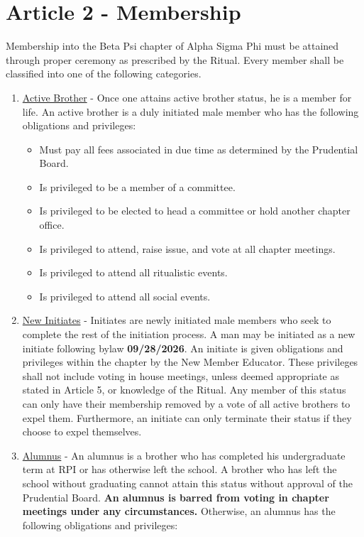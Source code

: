 \documentclass{article}
\begin{document}
\section*{Article 2 - Membership}
\hspace*{1cm}Membership into the Beta Psi chapter of Alpha Sigma Phi must be attained through proper ceremony as prescribed by the Ritual. Every member shall be classified into one of the following categories.
\begin{enumerate}
    \item  \underline{Active Brother} - Once one attains active brother status, he is a member for life. An active  brother is a duly initiated male member who has the following obligations and privileges:
    \begin{itemize}
        \item Must pay all fees associated in due time as determined by the Prudential Board.
        \item Is privileged to be a member of a committee.
        \item Is privileged to be elected to head a committee or hold another chapter office. 
        \item Is privileged to attend, raise issue, and vote at all chapter meetings.
        \item Is privileged to attend all ritualistic events.
        \item Is privileged to attend all social events.
    \end{itemize}
    \item  \underline{New Initiates} - Initiates are newly initiated male members who seek to complete the rest of the initiation process. A man may be initiated as a new initiate following bylaw \textbf{09/28/2026}. An initiate is given obligations and privileges within the chapter by the New Member Educator. These privileges shall not include voting in house meetings, unless deemed appropriate as stated in Article 5, or knowledge of the Ritual. Any member of this status can only have their membership removed by a vote of all active brothers to expel them. Furthermore, an initiate can only terminate their status if they choose to expel themselves.
    \item \underline{Alumnus} - An alumnus is a brother who has completed his undergraduate term at RPI or has otherwise left the school. A brother who has left the school without graduating cannot attain this status without approval of the Prudential Board. \textbf{An alumnus is barred from voting in chapter meetings under any circumstances.} Otherwise, an alumnus has the following obligations and privileges:

\end{enumerate}
\end{document}
